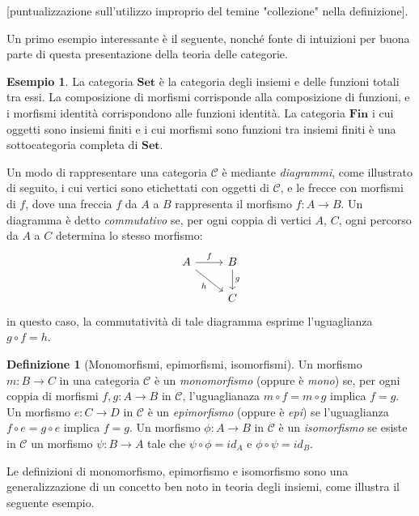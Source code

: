 \documentclass{article}
\theoremstyle{plain}
\theoremstyle{definition}
\newtheorem{definition}[theorem]{Definizione}
\newtheorem{example}[theorem]{Esempio}
\newcommand{\id}[1]{id_{#1}}
\begin{document}
	[puntualizzazione sull'utilizzo improprio del temine "collezione" nella definizione].
	
	Un primo esempio interessante è il seguente, nonché fonte di intuizioni per buona parte 
	di questa presentazione della teoria delle categorie.

	\begin{example}
		La categoria $\textbf{Set}$ è la categoria degli insiemi e delle funzioni totali tra essi. 
		La composizione di morfismi corrisponde alla composizione di funzioni, 
		e i morfismi identità corrispondono alle funzioni identità.
		La categoria $\textbf{Fin}$ i cui oggetti sono insiemi finiti e i cui morfismi sono 
		funzioni tra insiemi finiti è una sottocategoria completa di $\textbf{Set}$.
	\end{example}

	Un modo di rappresentare una categoria $\mathcal{C}$ è mediante \emph{diagrammi}, come illustrato di seguito,
	i cui vertici sono etichettati con oggetti di $\mathcal{C}$, e le frecce con morfismi di $f$, dove una 
	freccia $f$ da $A$ a $B$ rappresenta il morfismo $f: A \rightarrow B$. 
	Un diagramma è detto \emph{commutativo} se, per ogni coppia di vertici $A$, $C$, 
	ogni percorso da $A$ a $C$ determina lo stesso morfismo:
	\[
		\begin{tikzcd}
			A \arrow[r, "f"] \arrow[rd, "h" swap] & B  \arrow[d, "g"] \\
			& C 
		\end{tikzcd}
	\]
	in questo caso, la commutatività di tale diagramma esprime l'uguaglianza $g \circ f = h$.

	\begin{definition}[Monomorfismi, epimorfismi, isomorfismi]
		Un morfismo $m:B \rightarrow C$ in una categoria $\mathcal{C}$ è un \emph{monomorfismo}
		(oppure è \emph{mono}) se, per ogni coppia di morfismi $f, g: A \rightarrow B$ in $\mathcal{C}$, 
		l'uguaglianaza $m \circ f = m \circ g$ implica $f = g$. \-
		Un morfismo $e: C \rightarrow D$ in $\mathcal{C}$ è un \emph{epimorfismo} (oppure è \emph{epi}) se
		l'uguaglianza $f \circ e = g \circ e$ implica $f = g$. \-
		Un morfismo $\phi: A \rightarrow B$ in $\mathcal{C}$ è un \emph{isomorfismo} se esiste in $\mathcal{C}$
		un morfismo $\psi: B \rightarrow A$ tale che $\psi \circ \phi = \id{A}$ e $\phi \circ \psi = \id B$.

	\end{definition}

	Le definizioni di monomorfismo, epimorfismo e isomorfismo sono una generalizzazione di un concetto ben noto
	in teoria degli insiemi, come illustra il seguente esempio.
\end{document}
